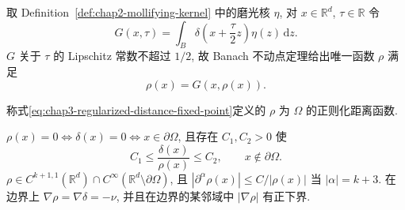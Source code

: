 取 Definition~\ref{def:chap2-mollifying-kernel} 中的磨光核 $\eta$, 对 $x\in\mathbb R^d$, $\tau\in\mathbb R$ 令
\[
 G(x,\tau)=\int_B\delta\left(x+\frac\tau2z\right)\eta(z)\,\mathrm dz.
\]
$G$ 关于 $\tau$ 的 Lipschitz 常数不超过 $1/2$, 故 Banach 不动点定理给出唯一函数 $\rho$ 满足
\begin{equation}
 \rho(x)=G(x,\rho(x)).
 \label{eq:chap3-regularized-distance-fixed-point}
\end{equation}

\begin{Definition}
\label{def:chap3-regularized-distance}
称式\eqref{eq:chap3-regularized-distance-fixed-point}定义的 $\rho$ 为 $\Omega$ 的正则化距离函数.
\end{Definition}

\begin{Proposition}
\label{prop:chap3-regularized-distance-properties}
$\rho(x)=0\Longleftrightarrow\delta(x)=0\Longleftrightarrow x\in\partial\Omega$, 且存在 $C_1,C_2>0$ 使
\begin{equation}
 C_1\leq\frac{\delta(x)}{\rho(x)}\leq C_2,
 \qquad x\notin\partial\Omega.
 \label{eq:chap3-distance-equivalence}
\end{equation}
$\rho\in C^{k+1,1}(\mathbb R^d)\cap C^\infty(\mathbb R^d\setminus\partial\Omega)$, 且 $|\partial^\alpha\rho(x)|\leq C/|\rho(x)|$ 当 $|\alpha|=k+3$. 在边界上 $\nabla\rho=\nabla\delta=-\nu$, 并且在边界的某邻域中 $|\nabla\rho|$ 有正下界.
\end{Proposition}

